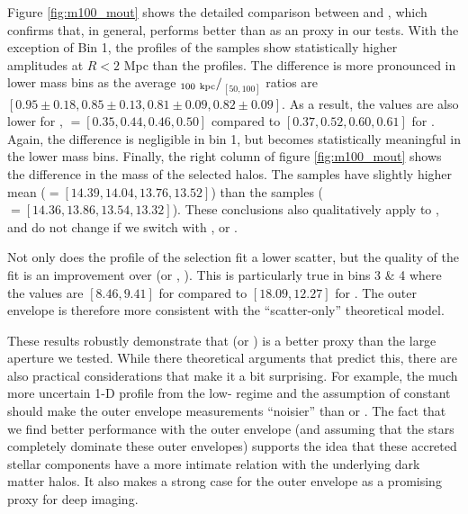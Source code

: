 \documentclass[fleqn,usenatbib,useAMS,english]{mnras}
\begin{document}
    Figure \ref{fig:m100_mout} shows the detailed comparison between  and ,
    which confirms that, in general,  performs better than 
    as an \mvir{} proxy in our \topn{} tests.
    With the exception of Bin 1, the \dsigma{} profiles of the  samples show
    statistically higher amplitudes at $R < 2$ Mpc than the  profiles.
    The difference is more pronounced in lower mass bins as the average
    \dsigma{}$_{100\ \rm kpc}/$\dsigma{}$_{[50,100]}$ ratios are
    $[0.95\pm0.18, 0.85\pm0.13, 0.81\pm0.09, 0.82\pm0.09]$.
    As a result, the \sigmvir{} values are also lower for , $=[0.35, 0.44, 0.46, 0.50]$
    compared to $[0.37, 0.52, 0.60, 0.61]$ for .
    Again, the difference is negligible in bin 1, but becomes statistically meaningful in the lower mass bins.
    Finally, the right column of figure \ref{fig:m100_mout} shows the difference in the mass of the selected halos.
    The  samples have slightly
    higher mean \mvir{} (\logmvir{}$=[14.39, 14.04, 13.76, 13.52]$) than the
     samples (\logmvir{}$=[14.36, 13.86, 13.54, 13.32]$).
    These conclusions also qualitatively apply to , and do not change
    if we switch  with , or \mmax{}.

    Not only does the \dsigma{} profile of the  selection fit a lower scatter,
    but the quality of the fit is an improvement over  (or , \mmax{}).
    This is particularly true in bins 3 \& 4 where the \chisq{} values are
    $[8.46, 9.41]$ for  compared to $[18.09, 12.27]$ for .
    The outer envelope is therefore more consistent with the ``scatter-only'' theoretical model.

    These results robustly demonstrate that  (or )
    is a better \mvir{} proxy than the large aperture \mstar{} we tested.
    While there theoretical arguments that predict this, there are also practical considerations
    that make it a bit surprising.
    For example, the much more uncertain 1-D profile from the low-\sb{} regime and the
    assumption of constant \mlratio{} should make the outer envelope \mstar{} measurements ``noisier''
    than  or .
    The fact that we find better performance with the outer envelope (and assuming that
    the \exsitu{} stars completely dominate these outer envelopes) supports
    the idea that these accreted stellar components have a more intimate
    relation with the underlying dark matter halos.
    It also makes a strong case for the outer envelope \mstar{} as a promising \mvir{} proxy for
    deep imaging.
\end{document}
